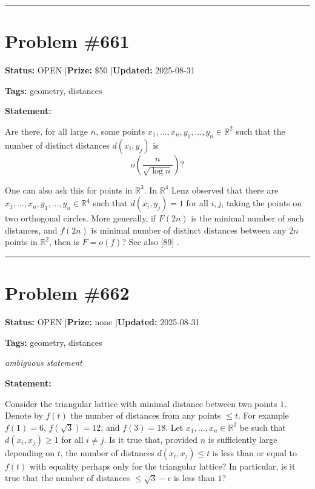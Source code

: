 \documentclass{article}
\begin{document}
\noindent\rule{\linewidth}{0.4pt}


\section{Problem \#661}
\label{prob:661}

\noindent\textbf{Status:} OPEN \quad|\quad \textbf{Prize:} \$50 \quad|\quad \textbf{Updated:} 2025-08-31

\noindent\textbf{Tags:} geometry, distances

\medskip

\noindent\textbf{Statement:}

Are there, for all large $n$, some points $x_1,\ldots,x_n,y_1,\ldots,y_n\in \mathbb{R}^2$ such that the number of distinct distances $d(x_i,y_j)$ is\[o\left(\frac{n}{\sqrt{\log n}}\right)?\]




One can also ask this for points in $\mathbb{R}^3$. In $\mathbb{R}^4$ Lenz observed that there are $x_1,\ldots,x_n,y_1,\ldots,y_n\in \mathbb{R}^4$ such that $d(x_i,y_j)=1$ for all $i,j$, taking the points on two orthogonal circles. More generally, if $F(2n)$ is the minimal number of such distances, and $f(2n)$ is minimal number of distinct distances between any $2n$ points in $\mathbb{R}^2$, then is $F =o(f)$? See also [89] .

\noindent\rule{\linewidth}{0.4pt}


\section{Problem \#662}
\label{prob:662}

\noindent\textbf{Status:} OPEN \quad|\quad \textbf{Prize:} none \quad|\quad \textbf{Updated:} 2025-08-31

\noindent\textbf{Tags:} geometry, distances

\medskip
\noindent\textit{ambiguous statement}


\noindent\textbf{Statement:}

Consider the triangular lattice with minimal distance between two points $1$. Denote by $f(t)$ the number of distances from any points $\leq t$. For example $f(1)=6$, $f(\sqrt{3})=12$, and $f(3)=18$. Let $x_1,\ldots,x_n\in \mathbb{R}^2$ be such that $d(x_i,x_j)\geq 1$ for all $i\neq j$. Is it true that, provided $n$ is sufficiently large depending on $t$, the number of distances $d(x_i,x_j)\leq t$ is less than or equal to $f(t)$ with equality perhaps only for the triangular lattice? In particular, is it true that the number of distances $\leq \sqrt{3}-\epsilon$ is less than $1$?
\end{document}

